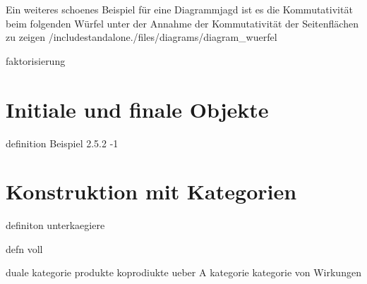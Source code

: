 \documentclass{article}
\begin{document}
		Ein weiteres schoenes Beispiel f\"ur eine Diagrammjagd ist es die Kommutativit\"at beim folgenden W\"urfel \cite[Quellcode anleihe]{tikzcdl} unter der Annahme der Kommutativit\"at der Seitenfl\"achen zu zeigen
		/includestandalone{./files/diagrams/diagram_wuerfel}
		
faktorisierung


\section{Initiale und finale Objekte}
definition
Beispiel 2.5.2 -1

\section{Konstruktion mit Kategorien}
definiton unterkaegiere

defn voll

duale kategorie 
produkte
koprodiukte
ueber A kategorie
kategorie von Wirkungen
\end{document}
